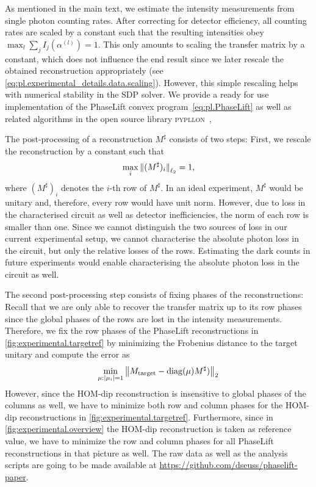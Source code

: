 As mentioned in the main text, we estimate the intensity measurements from single photon counting rates.
After correcting for detector efficiency, all counting rates are scaled by a constant such that the resulting intensities obey $\max_l \sum_j I_j(\alpha^{(l)}) = 1$.
This only amounts to scaling the transfer matrix by a constant, which does not influence the end result since we later rescale the obtained reconstruction appropriately (see \cref{eq:pl.experimental_details.data.scaling}).
However, this simple rescaling helps with numerical stability in the SDP solver.
We provide a ready for use implementation of the PhaseLift convex program~\eqref{eq:pl.PhaseLift} as well as related algorithms in the open source library \textsc{pypllon}~\cite{Suess_2017_Pypllon},

The post-processing of a reconstruction ${M}^\sharp$ consists of two steps:
First, we rescale the reconstruction by a constant such that
\[
  \label{eq:pl.experimental_details.data.scaling}
  \max_i {\Vert(M^\sharp)_i\Vert}_{\ell_2} = 1,
\]
where $(M^\sharp)_i$ denotes the $i$-th row of $M^\sharp$.
In an ideal experiment, $M^\sharp$ would be unitary and, therefore, every row would have unit norm.
However, due to loss in the characterised circuit as well as detector inefficiencies, the norm of each row is smaller than one.
Since we cannot distinguish the two sources of loss in our current experimental setup, we cannot characterise the absolute photon loss in the circuit, but only the relative losses of the rows.
Estimating the dark counts in future experiments would enable characterising the absolute photon loss in the circuit as well.

The second post-processing step consists of fixing phases of the reconstructions:
Recall that we are only able to recover the transfer matrix up to its row phases since the global phases of the rows are lost in the intensity measurements.
Therefore, we fix the row phases of the PhaseLift reconstructions in \cref{fig:experimental.targetref} by minimizing the Frobenius distance to the target unitary and compute the error as
\[
  \min_{{\mu}: {\vert\mu_i\vert} = 1}\left\|  {M}_\mathrm{target} -  \mathrm{diag} ({\mu}) {M}^\sharp) \right\|_2
\]
However, since the HOM-dip reconstruction is insensitive to global phases of the columns as well, we have to minimize both row and column phases for the HOM-dip reconstructions in \cref{fig:experimental.targetref}.
Furthermore, since in \cref{fig:experimental.overview} the HOM-dip reconstruction is taken as reference value, we have to minimize the row and column phases for all PhaseLift reconstructions in that picture as well.
The raw data as well as the analysis scripts are going to be made available at \url{https://github.com/dseuss/phaselift-paper}.
